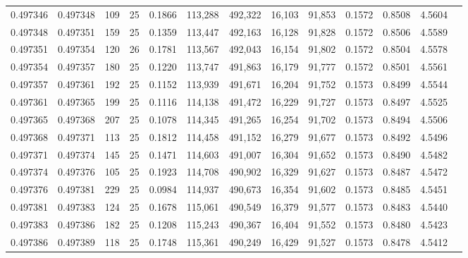 \begin{tabular}{rrrrrrrrrrrrr}
0.497346 & 0.497348 & 109 &  25 &                                     0.1866 & 113,288 & 492,322 &  16,103 &  91,853 & 0.1572 & 0.8508 & 4.5604 \\
0.497348 & 0.497351 & 159 &  25 &                                     0.1359 & 113,447 & 492,163 &  16,128 &  91,828 & 0.1572 & 0.8506 & 4.5589 \\
0.497351 & 0.497354 & 120 &  26 &                                     0.1781 & 113,567 & 492,043 &  16,154 &  91,802 & 0.1572 & 0.8504 & 4.5578 \\
0.497354 & 0.497357 & 180 &  25 &                                     0.1220 & 113,747 & 491,863 &  16,179 &  91,777 & 0.1572 & 0.8501 & 4.5561 \\
0.497357 & 0.497361 & 192 &  25 &                                     0.1152 & 113,939 & 491,671 &  16,204 &  91,752 & 0.1573 & 0.8499 & 4.5544 \\
0.497361 & 0.497365 & 199 &  25 &                                     0.1116 & 114,138 & 491,472 &  16,229 &  91,727 & 0.1573 & 0.8497 & 4.5525 \\
0.497365 & 0.497368 & 207 &  25 &                                     0.1078 & 114,345 & 491,265 &  16,254 &  91,702 & 0.1573 & 0.8494 & 4.5506 \\
0.497368 & 0.497371 & 113 &  25 &                                     0.1812 & 114,458 & 491,152 &  16,279 &  91,677 & 0.1573 & 0.8492 & 4.5496 \\
0.497371 & 0.497374 & 145 &  25 &                                     0.1471 & 114,603 & 491,007 &  16,304 &  91,652 & 0.1573 & 0.8490 & 4.5482 \\
0.497374 & 0.497376 & 105 &  25 &                                     0.1923 & 114,708 & 490,902 &  16,329 &  91,627 & 0.1573 & 0.8487 & 4.5472 \\
0.497376 & 0.497381 & 229 &  25 &                                     0.0984 & 114,937 & 490,673 &  16,354 &  91,602 & 0.1573 & 0.8485 & 4.5451 \\
0.497381 & 0.497383 & 124 &  25 &                                     0.1678 & 115,061 & 490,549 &  16,379 &  91,577 & 0.1573 & 0.8483 & 4.5440 \\
0.497383 & 0.497386 & 182 &  25 &                                     0.1208 & 115,243 & 490,367 &  16,404 &  91,552 & 0.1573 & 0.8480 & 4.5423 \\
0.497386 & 0.497389 & 118 &  25 &                                     0.1748 & 115,361 & 490,249 &  16,429 &  91,527 & 0.1573 & 0.8478 & 4.5412 \\

\end{tabular}
